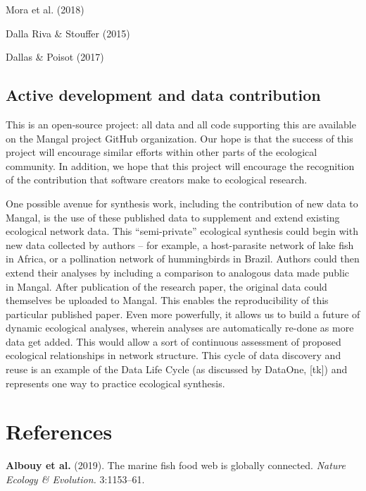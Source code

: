 Mora et al. (2018)

Dalla Riva \& Stouffer (2015)

Dallas \& Poisot (2017)

\hypertarget{active-development-and-data-contribution}{%
\subsection{Active development and data
contribution}\label{active-development-and-data-contribution}}

This is an open-source project: all data and all code supporting this
are available on the Mangal project GitHub organization. Our hope is
that the success of this project will encourage similar efforts within
other parts of the ecological community. In addition, we hope that this
project will encourage the recognition of the contribution that software
creators make to ecological research.

One possible avenue for synthesis work, including the contribution of
new data to Mangal, is the use of these published data to supplement and
extend existing ecological network data. This ``semi-private''
ecological synthesis could begin with new data collected by authors --
for example, a host-parasite network of lake fish in Africa, or a
pollination network of hummingbirds in Brazil. Authors could then extend
their analyses by including a comparison to analogous data made public
in Mangal. After publication of the research paper, the original data
could themselves be uploaded to Mangal. This enables the reproducibility
of this particular published paper. Even more powerfully, it allows us
to build a future of dynamic ecological analyses, wherein analyses are
automatically re-done as more data get added. This would allow a sort of
continuous assessment of proposed ecological relationships in network
structure. This cycle of data discovery and reuse is an example of the
Data Life Cycle (as discussed by DataOne, {[}tk{]}) and represents one
way to practice ecological synthesis.

\hypertarget{references}{%
\section*{References}\label{references}}

\hypertarget{refs}{}
\leavevmode\hypertarget{ref-AlboArch19}{}%
\textbf{Albouy et al.} (2019). The marine fish food web is globally
connected. \emph{Nature Ecology \& Evolution.} 3:1153--61.


